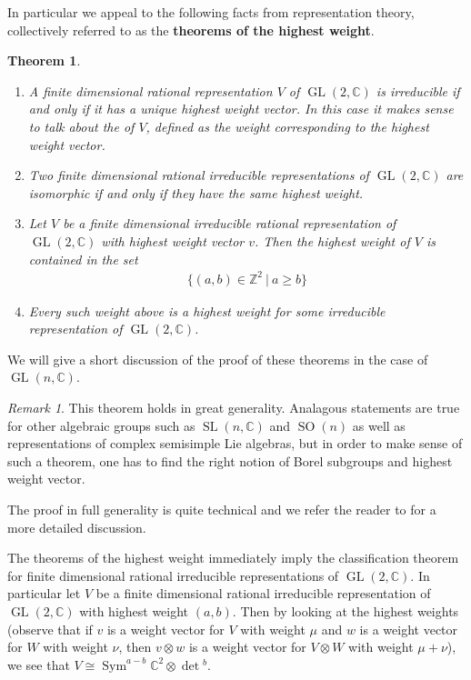 \documentclass[manuscript, printscheme]{aomart}
\theoremstyle{plain} %
\newtheorem{theorem}[equation]{Theorem}
\theoremstyle{definition}
\theoremstyle{remark}
\newtheorem{remark}[equation]{Remark}
\newcommand{\st}{\ \vert \ }
\DeclareMathOperator{\GL}{GL}
\DeclareMathOperator{\Sym}{Sym}
\newcommand{\C}{\mathbb{C}}
\newcommand{\Z}{\mathbb{Z}}
\DeclareMathOperator{\SL}{SL}
\DeclareMathOperator{\SO}{SO}
\newcommand{\set}[1]{\{#1\}}
\begin{document}
\hfill

In particular we appeal to the following facts from representation theory,
collectively referred to as the \textbf{theorems of the highest weight}.
\begin{theorem}\label{thm:hw}
	\hfill
	\begin{enumerate}
		\item A finite dimensional rational representation $V$ of $\GL(2,\C)$ is irreducible if and only if it has a unique highest weight vector.
		      In this case it makes sense to talk about the  of $V$, defined as the weight corresponding to the highest weight vector.
		\item Two finite dimensional rational irreducible representations of $\GL(2,\C)$ are isomorphic if and only if they have the same highest weight.
		\item Let $V$ be a finite dimensional irreducible rational representation of $\GL(2,\C)$ with highest weight vector $v$. Then the highest weight of $V$ is contained in the set \begin{align*}
			      \set{(a,b)\in \Z^2 \st a\geq b }
		      \end{align*}
		\item Every such weight above is a highest weight for some irreducible representation of $\GL(2,\C)$.
	\end{enumerate}
\end{theorem}

We will give a short discussion of the proof of these theorems in the case of $\GL(n,\C)$.

\begin{remark}
	This theorem holds in great generality. Analagous 
    statements are true for other algebraic groups such as $\SL(n,\C)$ and $\SO(n)$ as well as representations of complex semisimple Lie algebras,
	but in order to make sense of such a theorem, one has to find the right notion of Borel subgroups and
	highest weight vector.
\end{remark}

The proof in full generality is quite technical and we refer the reader to \cite{milne} for a more detailed discussion.

\hfill

The theorems of the highest weight immediately imply the classification theorem for finite dimensional rational irreducible representations of $\GL(2,\C)$.
In particular let $V$ be a finite dimensional rational irreducible representation of $\GL(2,\C)$ with highest weight $(a,b)$. Then
by looking at the highest weights (observe that if $v$ is a weight vector for $V$ with weight $\mu$ and
$w$ is a weight vector for $W$ with weight $\nu$, then $v\otimes w$ is a weight vector for $V\otimes W$ with weight $\mu + \nu$),
 we see that $V \cong \Sym^{a-b}\C^2 \otimes \det{}^{b}$.
\end{document}
